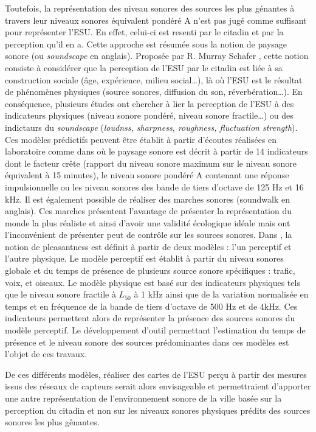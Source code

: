 Toutefois, la représentation des niveau sonores des sources les plus génantes à travers leur niveaux sonores équivalent pondéré A n'est pas jugé comme suffisant pour représenter l'ESU. En effet, celui-ci est resenti par le citadin et par la perception qu'il en a. Cette approche est résumée sous la notion de paysage sonore (ou \textit{soundscape} en anglais). Proposée par R. Murray Schafer \cite{schafer1977tuning}, cette notion consiste à considérer que la perception de l'ESU par le citadin est liée à sa construction sociale (âge, expérience, milieu social\dots), là où l'ESU est  le résultat de phénomènes physiques (source sonores, diffusion du son, réverbération\dots). En conséquence, plusieurs études ont chercher à lier la perception de l'ESU à des indicateurs physiques (niveau sonore pondéré, niveau sonore fractile\dots) ou des indictaurs du \textit{soundscape} (\textit{loudnss, sharpness, roughness, fluctuation strength}). 
Ces modèles prédictifs peuvent être établit à partir d'écoutes réalisées en laboratoire comme dans \cite{torija2013application} où le paysage sonore est décrit à partir de 14 indicateurs dont le facteur crête (rapport du niveau sonore maximum sur le niveau sonore équivalent à 15 minutes), le niveau sonore pondéré A contenant une réponse impulsionnelle ou les niveau sonores des bande de tiers d'octave de 125 Hz et 16 kHz.
Il est également possible de réaliser des marches sonores (soundwalk en anglais). Ces marches présentent l'avantage de présenter la représentation du monde la plus réaliste et ainsi d'avoir une validité écologique idéale mais ont l'inconvénient de présenter peut de contrôle sur les sources sonores. Dans \cite{aumond2017modeling}, la notion de pleasantness est  définit à partir de deux modèles : l'un perceptif et l'autre physique. Le modèle perceptif est établit à partir du niveau sonores globale et du temps de présence de plusieurs source sonore spécifiques : trafic, voix, et oiseaux. Le modèle physique est basé sur des indicateurs physiques tels que le niveau sonore fractile à $L_{50}$ à 1 kHz ainsi que de la variation normalisée en temps et en fréquence de la bande de tiers d'octave de 500 Hz et de 4kHz. Ces indicateurs permettent alors de représenter la présence des sources sonores du modèle perceptif. 
Le développement d'outil permettant l'estimation du temps de présence et le niveau sonore des sources prédominantes dans ces modèles est l'objet de ces travaux.

De ces différents modèles, réaliser des cartes de l'ESU perçu à partir des mesures issus des réseaux de capteurs serait alors envisageable et permettraient d'apporter une autre représentation de l'environnement sonore de la ville basée sur la perception du citadin et non sur les niveaux sonores physiques prédits des sources sonores les plus gênantes.

